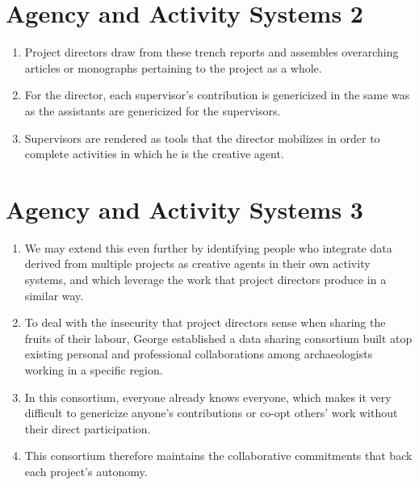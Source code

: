 \documentclass{article}
\begin{document}
\section{Agency and Activity Systems 2}
\begin{enumerate}
  \item Project directors draw from these trench reports and assembles overarching articles or monographs pertaining to the project as a whole.
  \item For the director, each supervisor's contribution is genericized in the same was as the assistants are genericized for the supervisors.
  \item Supervisors are rendered as tools that the director mobilizes in order to complete activities in which he is the creative agent.
\end{enumerate}

\section{Agency and Activity Systems 3}
\begin{enumerate}
  \item We may extend this even further by identifying people who integrate data derived from multiple projects as creative agents in their own activity systems, and which leverage the work that project directors produce in a similar way.
  \item To deal with the insecurity that project directors sense when sharing the fruits of their labour, George established a data sharing consortium built atop existing personal and professional collaborations among archaeologists working in a specific region.
  \item In this consortium, everyone already knows everyone, which makes it very difficult to genericize anyone's contributions or co-opt others' work without their direct participation.
  \item This consortium therefore maintains the collaborative commitments that back each project's autonomy.
\end{enumerate}
\end{document}
